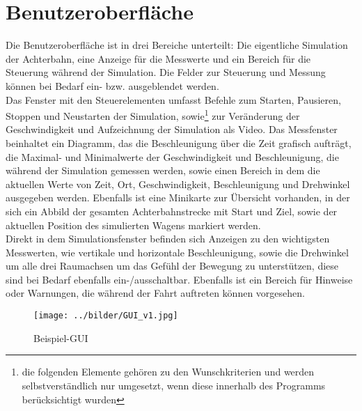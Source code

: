 
\chapter{Benutzeroberfläche}

Die Benutzeroberfläche ist in drei Bereiche unterteilt: Die eigentliche Simulation der Achterbahn, eine Anzeige für die Messwerte und ein Bereich für die Steuerung während der Simulation. Die Felder zur Steuerung und Messung können bei Bedarf ein- bzw. ausgeblendet werden.\\
Das Fenster mit den Steuerelementen umfasst Befehle zum Starten, Pausieren, Stoppen und Neustarten der Simulation, sowie\footnote{die folgenden Elemente gehören zu den Wunschkriterien und werden selbstverständlich nur umgesetzt, wenn diese innerhalb des Programms berücksichtigt wurden} zur Veränderung der Geschwindigkeit und Aufzeichnung der Simulation als Video.
Das Messfenster beinhaltet ein Diagramm, das die Beschleunigung über die Zeit grafisch aufträgt, die Maximal- und Minimalwerte der Geschwindigkeit und Beschleunigung, die während der Simulation gemessen werden, sowie einen Bereich in dem die aktuellen Werte von Zeit, Ort, Geschwindigkeit, Beschleunigung und Drehwinkel ausgegeben werden.
Ebenfalls ist eine Minikarte zur Übersicht vorhanden, in der sich ein Abbild der gesamten Achterbahnstrecke mit Start und Ziel, sowie der aktuellen Position des simulierten Wagens markiert werden.\\
Direkt in dem Simulationsfenster befinden sich Anzeigen zu den wichtigsten Messwerten, wie vertikale und horizontale Beschleunigung, sowie die Drehwinkel um alle drei Raumachsen um das Gefühl der Bewegung zu unterstützen, diese sind bei Bedarf ebenfalls ein-/ausschaltbar. Ebenfalls ist ein Bereich für Hinweise oder Warnungen, die während der Fahrt auftreten können vorgesehen. 
\begin{figure}[!h]%
\texttt{[image: ../bilder/GUI\_v1.jpg]}%
\caption{Beispiel-GUI}%
\label{}%
\end{figure}